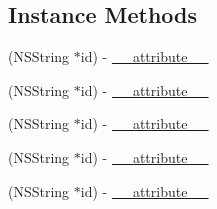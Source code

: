 \subsection*{Instance Methods}
\begin{DoxyCompactItemize}
\item 
(N\+S\+String $\ast$id) -\/ \hyperlink{protocolFBOpenGraphAction-p_a19948d4253cde780af8d45d030803063}{\+\_\+\+\_\+attribute\+\_\+\+\_\+}
\item 
(N\+S\+String $\ast$id) -\/ \hyperlink{protocolFBOpenGraphAction-p_a19948d4253cde780af8d45d030803063}{\+\_\+\+\_\+attribute\+\_\+\+\_\+}
\item 
(N\+S\+String $\ast$id) -\/ \hyperlink{protocolFBOpenGraphAction-p_a19948d4253cde780af8d45d030803063}{\+\_\+\+\_\+attribute\+\_\+\+\_\+}
\item 
(N\+S\+String $\ast$id) -\/ \hyperlink{protocolFBOpenGraphAction-p_a19948d4253cde780af8d45d030803063}{\+\_\+\+\_\+attribute\+\_\+\+\_\+}
\item 
(N\+S\+String $\ast$id) -\/ \hyperlink{protocolFBOpenGraphAction-p_a19948d4253cde780af8d45d030803063}{\+\_\+\+\_\+attribute\+\_\+\+\_\+}
\end{DoxyCompactItemize}
